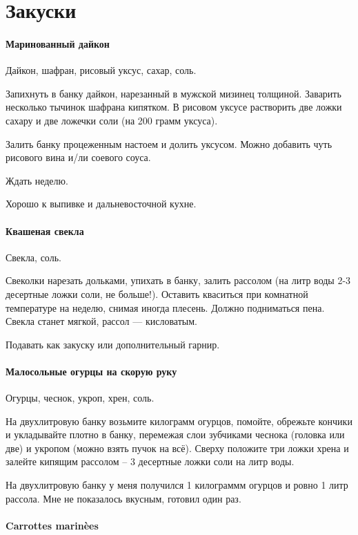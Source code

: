 \documentclass[11pt,a5paper]{article}
\begin{document}
\section{Закуски}
\paragraph{Маринованный дайкон} %

Дайкон, шафран, рисовый уксус, сахар, соль.

Запихнуть в банку дайкон, нарезанный в мужской мизинец толщиной.
Заварить несколько тычинок шафрана кипятком.
В рисовом уксусе растворить две ложки сахару и две ложечки соли (на 200 грамм уксуса).

Залить банку процеженным настоем и долить уксусом. Можно добавить чуть рисового вина и/ли соевого соуса.

Ждать неделю.

Хорошо к выпивке и дальневосточной кухне.

\paragraph{Квашеная свекла}

Свекла, соль.

Свеколки нарезать дольками, упихать в банку, залить рассолом (на литр воды 2-3 десертные ложки соли, не больше!). Оставить кваситься при комнатной температуре на неделю, снимая иногда плесень. Должно подниматься пена. Свекла станет мягкой, рассол --- кисловатым. 

Подавать как закуску или дополнительный гарнир.

\paragraph{Малосольные огурцы на скорую руку} %

Огурцы, чеснок, укроп, хрен, соль.

На двухлитровую банку возьмите килограмм огурцов, помойте, обрежьте кончики и укладывайте плотно в банку, перемежая слои зубчиками чеснока (головка или две) и укропом (можно взять пучок на всё). Сверху положите три ложки хрена и залейте кипящим рассолом -- 3 десертные ложки соли на литр воды.

На двухлитровую банку у меня получился 1 килограммм огурцов и ровно 1 литр рассола. Мне не показалось вкусным, готовил один раз.

\paragraph{Carrottes marinèes} %
\end{document}
